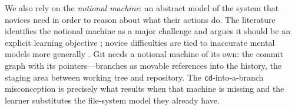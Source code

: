 We also rely on the \emph{notional machine}: an abstract model of the
system that novices need in order to reason about what their actions do.
The literature identifies the notional machine as a major challenge and
argues it should be an explicit learning objective
\autocite{Sorva2013NotionalMachines,DuBoulay1981BlackBox}; novice
difficulties are tied to inaccurate mental models more generally
\autocite{QianLehman2017Misconceptions,BenAri1998Constructivism}.
Git needs a notional machine of its own: the commit graph with its
pointers---branches as movable references into the history, the staging
area between working tree and repository.
The \texttt{cd}-into-a-branch misconception \autocite{IsomottonenCochez2014}
is precisely what results when that machine is missing and the learner
substitutes the file-system model they already have.
